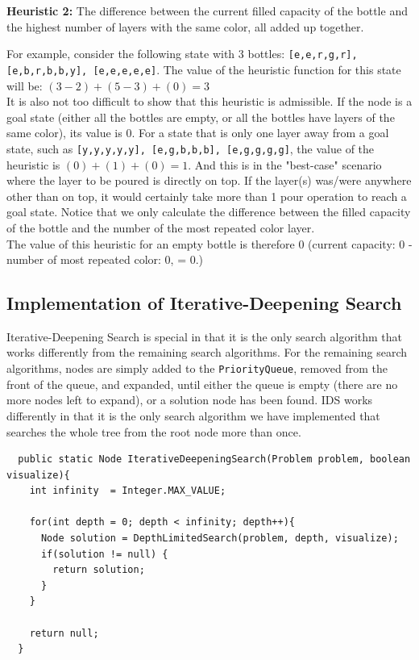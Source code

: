 \documentclass{article}
\begin{document}
\textbf{Heuristic 2:} The difference between the current filled capacity of the bottle and the highest number of layers with the same color, all added up together.

For example, consider the following state with 3 bottles: \texttt{[e,e,r,g,r], [e,b,r,b,b,y], [e,e,e,e,e]}. The value of the heuristic function for this state will be: $(3 - 2) + (5 - 3) + (0) = 3$ \\

It is also not too difficult to show that this heuristic is admissible. If the node is a goal state (either all the bottles are empty, or all the bottles have layers of the same color), its value is 0. For a state that is only one layer away from a goal state, such as \texttt{[y,y,y,y,y], [e,g,b,b,b], [e,g,g,g,g]}, the value of the heuristic is $(0) + (1) + (0) = 1$. And this is in the "best-case" scenario where the layer to be poured is directly on top. If the layer(s) was/were anywhere other than on top, it would certainly take more than 1 pour operation to reach a goal state. Notice that we only calculate the difference between the filled capacity of the bottle and the number of the most repeated color layer. \\

The value of this heuristic for an empty bottle is therefore 0 (current capacity: 0 - number of most repeated color: 0, = 0.)



\subsection{Implementation of Iterative-Deepening Search}

Iterative-Deepening Search is special in that it is the only search algorithm that works differently from the remaining search algorithms. For the remaining search algorithms, nodes are simply added to the \texttt{PriorityQueue}, removed from the front of the queue, and expanded, until either the queue is empty (there are no more nodes left to expand), or a solution node has been found. IDS works differently in that it is the only search algorithm we have implemented that searches the whole tree from the root node more than once.

\begin{verbatim}
  public static Node IterativeDeepeningSearch(Problem problem, boolean visualize){
    int infinity  = Integer.MAX_VALUE;

    for(int depth = 0; depth < infinity; depth++){
      Node solution = DepthLimitedSearch(problem, depth, visualize);
      if(solution != null) {
        return solution;
      }
    }

    return null;
  }
\end{verbatim}
\end{document}

